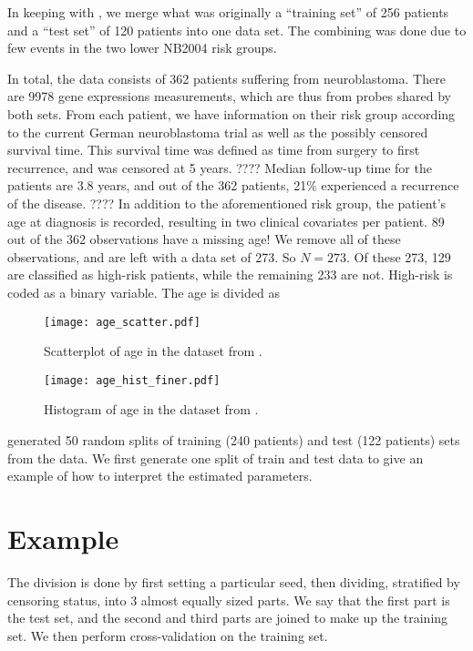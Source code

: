 In keeping with \citet{bovelstad2009}, we merge what was originally a ``training set'' of 256 patients and a ``test set'' of 120 patients into one data set.
The combining was done due to few events in the two lower NB2004 risk groups.

In total, the data consists of 362 patients suffering from neuroblastoma.
There are 9978 gene expressions measurements, which are thus from probes shared by both sets.
From each patient, we have information on their risk group according to the current German neuroblastoma trial as well as the possibly censored survival time.
This survival time was defined as time from surgery to first recurrence, and was censored at 5 years. ????
Median follow-up time for the patients are 3.8 years, and out of the 362 patients, 21\% experienced a recurrence of the disease. ????
In addition to the aforementioned risk group, the patient's age at diagnosis is recorded, resulting in two clinical covariates per patient.
89 out of the 362 observations have a missing age!
We remove all of these observations, and are left with a data set of 273. So $N=273$.
Of these 273, 129 are classified as high-risk patients, while the remaining 233 are not.
High-risk is coded as a binary variable.
The age is divided as 

\begin{figure}\label{fig:age-scatter}
\caption{Scatterplot of age in the dataset from \citet{oberthuer-data}.}
\centering\texttt{[image: age\_scatter.pdf]}
\end{figure}

\begin{figure}\label{fig:age-hist}
\caption{Histogram of age in the dataset from \citet{oberthuer-data}.}
\centering\texttt{[image: age\_hist\_finer.pdf]}
\end{figure}

\citet{bovelstad2009} generated 50 random splits of training (240 patients) and test (122 patients) sets from the data.
We first generate one split of train and test data to give an example of how to interpret the estimated parameters.

\section{Example}
The division is done by first setting a particular seed, then dividing, stratified by censoring status, into 3 almost equally sized parts.
We say that the first part is the test set, and the second and third parts are joined to make up the training set.
We then perform cross-validation on the training set.

